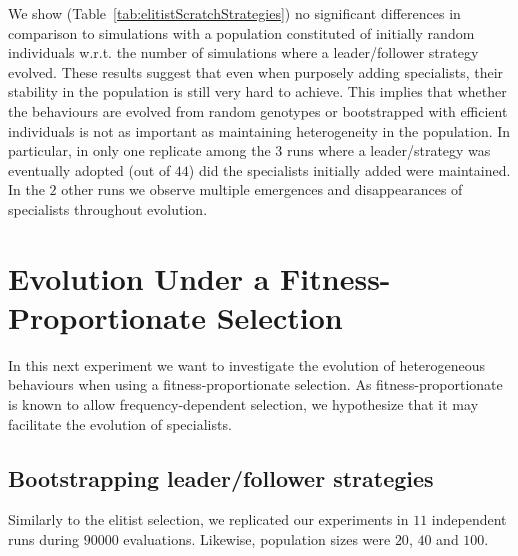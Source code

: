     We show (Table~\ref{tab:elitistScratchStrategies}) no significant differences in comparison to simulations with a population constituted of initially random individuals w.r.t. the number of simulations where a leader/follower strategy evolved. These results suggest that even when purposely adding specialists, their stability in the population is still very hard to achieve. This implies that whether the behaviours are evolved from random genotypes or bootstrapped with efficient individuals is not as important as maintaining heterogeneity in the population. In particular, in only one replicate among the $3$ runs where a leader/strategy was eventually adopted (out of $44$) did the specialists initially added were maintained. In the $2$ other runs we observe multiple emergences and disappearances of specialists throughout evolution. 


\section{Evolution Under a Fitness-Proportionate Selection}
\label{sec:fitpropEvolution}
  In this next experiment we want to investigate the evolution of heterogeneous behaviours when using a fitness-proportionate selection. As fitness-proportionate is known to allow frequency-dependent selection, we hypothesize that it may facilitate the evolution of specialists.

  \subsection{Bootstrapping leader/follower strategies}
    Similarly to the elitist selection, we replicated our experiments in $11$ independent runs during $90000$ evaluations. Likewise, population sizes were $20$, $40$ and $100$. 
    
